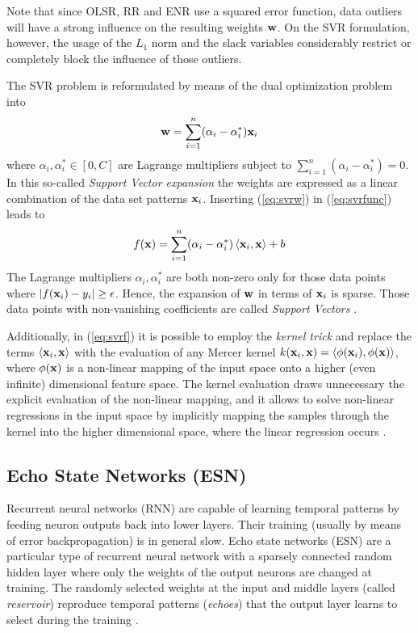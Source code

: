 Note that since OLSR, RR and ENR use a squared error function, data
outliers will have a strong influence on the resulting weights
$\mathbf{w}$.  On the SVR formulation, however, the usage of the $L_1$
norm and the slack variables considerably restrict or completely block
the influence of those outliers.

The SVR problem is reformulated by means of the dual optimization
problem into \citep{Smola2004}
\begin{equation}
  \label{eq:svrw}
  \mathbf{w}=\sum_{i=1}^n(\alpha_i-\alpha_i^\ast)\mathbf{x}_i
\end{equation}
where $\alpha_i,\alpha_i^\ast\in[0,C]$ are Lagrange multipliers
subject to $\sum_{i=1}^n(\alpha_i-\alpha_i^\ast)=0$.
%
In this so-called \emph{Support Vector expansion} the weights are
expressed as a linear combination of the data set patterns
$\mathbf{x}_i$.
%
Inserting (\ref{eq:svrw}) in (\ref{eq:svrfunc}) leads to
\begin{equation}
  \label{eq:svrf}
 f(\mathbf{x}) = \sum_{i=1}^n(\alpha_i-\alpha_i^\ast)\left\langle\mathbf{x}_i,\mathbf{x}\right\rangle + b
\end{equation}
The Lagrange multipliers $\alpha_i,\alpha_i^\ast$ are both non-zero
only for those data points where $|f(\mathbf{x}_i) - y_i|\geq\epsilon$.
Hence, the expansion of $\mathbf{w}$ in terms of $\mathbf{x}_i$ is sparse.
Those data points with non-vanishing coefficients are called
\emph{Support Vectors} \citep{Wei2013}.

Additionally, in (\ref{eq:svrf}) it is possible to employ the
\emph{kernel trick} and replace the terms $\left\langle\mathbf{x}_i,\mathbf{x}\right\rangle$ with
the evaluation of any Mercer kernel
$k(\mathbf{x}_i,\mathbf{x})=\left\langle\phi(\mathbf{x}_i),\phi(\mathbf{x})\right\rangle$, where
$\phi(\mathbf{x})$ is a non-linear mapping of the input space onto a
higher (even infinite) dimensional feature space.
%
The kernel evaluation draws unnecessary the explicit evaluation of the
non-linear mapping, and it allows to solve non-linear regressions in
the input space by implicitly mapping the samples through the kernel
into the higher dimensional space, where the linear regression occurs
\citep{Alonso2013}.



\subsection{Echo State Networks (ESN)}

Recurrent neural networks (RNN) are capable of learning temporal
patterns by feeding neuron outputs back into lower layers. Their
training (usually by means of error backpropagation) is in general
slow.
%
Echo state networks (ESN) are a particular type of recurrent neural
network with a sparsely connected random hidden layer where only the
weights of the output neurons are changed at training.  The randomly
selected weights at the input and middle layers (called \emph{reservoir})
reproduce temporal patterns (\emph{echoes}) that the output layer
learns to select during the training \citep{Lukose2009}.

